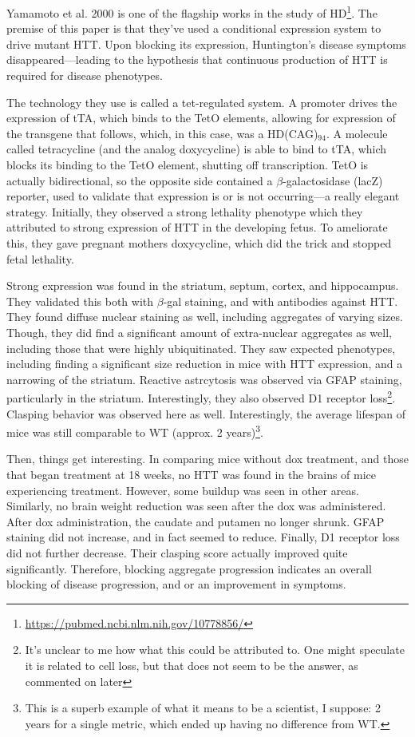Yamamoto et al. 2000 is one of the flagship works in the study of HD\footnote{\url{https://pubmed.ncbi.nlm.nih.gov/10778856/}}. The premise of this paper is that they've used a conditional expression system to drive mutant HTT. Upon blocking its expression, Huntington's disease symptoms disappeared---leading to the hypothesis that continuous production of HTT is required for disease phenotypes.\newline

The technology they use is called a tet-regulated system. A promoter drives the expression of tTA, which binds to the TetO elements, allowing for expression of the transgene that follows, which, in this case, was a HD(CAG)$_{94}$. A molecule called tetracycline (and the analog doxycycline) is able to bind to tTA, which blocks its binding to the TetO element, shutting off transcription. TetO is actually bidirectional, so the opposite side contained a $\beta$-galactosidase (lacZ) reporter, used to validate that expression is or is not occurring---a really elegant strategy. Initially, they observed a strong lethality phenotype which they attributed to strong expression of HTT in the developing fetus. To ameliorate this, they gave pregnant mothers doxycycline, which did the trick and stopped fetal lethality.\newline

Strong expression was found in the striatum, septum, cortex, and hippocampus. They validated this both with $\beta$-gal staining, and with antibodies against HTT. They found diffuse nuclear staining as well, including aggregates of varying sizes. Though, they did find a significant amount of extra-nuclear aggregates as well, including those that were highly ubiquitinated. They saw expected phenotypes, including finding a significant size reduction in mice with HTT expression, and a narrowing of the striatum. Reactive astrcytosis was observed via GFAP staining, particularly in the striatum. Interestingly, they also observed D1 receptor loss\footnote{It's unclear to me how what this could be attributed to. One might speculate it is related to cell loss, but that does not seem to be the answer, as commented on later}. Clasping behavior was observed here as well. Interestingly, the average lifespan of mice was still comparable to WT (approx. 2 years)\footnote{This is a superb example of what it means to be a scientist, I suppose: 2 years for a single metric, which ended up having no difference from WT.}.\newline

Then, things get interesting. In comparing mice without dox treatment, and those that began treatment at 18 weeks, no HTT was found in the brains of mice experiencing treatment. However, some buildup was seen in other areas. Similarly, no brain weight reduction was seen after the dox was administered. After dox administration, the caudate and putamen no longer shrunk. GFAP staining did not increase, and in fact seemed to reduce. Finally, D1 receptor loss did not further decrease. Their clasping score actually improved quite significantly. Therefore, blocking aggregate progression indicates an overall blocking of disease progression, and or an improvement in symptoms.\newline 

